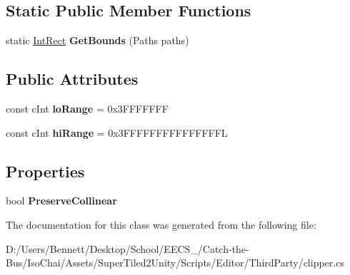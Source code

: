 \subsection*{Static Public Member Functions}
\begin{DoxyCompactItemize}
\item 
\mbox{\label{class_super_tiled2_unity_1_1_editor_1_1_clipper_lib_1_1_clipper_base_ac7be5667394c1f4d70f2ca1c59edbe7c}} 
static \mbox{\hyperlink{struct_super_tiled2_unity_1_1_editor_1_1_clipper_lib_1_1_int_rect}{Int\+Rect}} {\bfseries Get\+Bounds} (Paths paths)
\end{DoxyCompactItemize}
\subsection*{Public Attributes}
\begin{DoxyCompactItemize}
\item 
\mbox{\label{class_super_tiled2_unity_1_1_editor_1_1_clipper_lib_1_1_clipper_base_a6551e9613dc65a0a47e919eee6e5000e}} 
const c\+Int {\bfseries lo\+Range} = 0x3\+F\+F\+F\+F\+F\+FF
\item 
\mbox{\label{class_super_tiled2_unity_1_1_editor_1_1_clipper_lib_1_1_clipper_base_ad975c6d2f6be1cd38c0ba5578d2e9d4f}} 
const c\+Int {\bfseries hi\+Range} = 0x3\+F\+F\+F\+F\+F\+F\+F\+F\+F\+F\+F\+F\+F\+F\+FL
\end{DoxyCompactItemize}
\subsection*{Properties}
\begin{DoxyCompactItemize}
\item 
\mbox{\label{class_super_tiled2_unity_1_1_editor_1_1_clipper_lib_1_1_clipper_base_a69353e844514ed0900c99fdf7c7de4ae}} 
bool {\bfseries Preserve\+Collinear}
\end{DoxyCompactItemize}


The documentation for this class was generated from the following file\+:\begin{DoxyCompactItemize}
\item 
D\+:/\+Users/\+Bennett/\+Desktop/\+School/\+E\+E\+C\+S\+\_/\+Catch-\/the-\/\+Bus/\+Iso\+Chai/\+Assets/\+Super\+Tiled2\+Unity/\+Scripts/\+Editor/\+Third\+Party/clipper.\+cs\end{DoxyCompactItemize}
